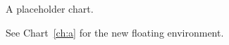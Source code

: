 \documentclass{article}
\begin{document}
\begin{chart}
\centering A placeholder chart.
\caption{A chart}\label{ch:a}
\end{chart}
See Chart~\ref{ch:a} for the new floating environment.
\end{document}
